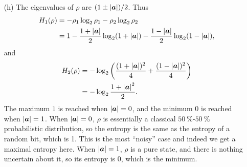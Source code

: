 \documentclass[hyperref, a4paper]{article}
\begin{document}
\begin{itemize}
\item[(h)] The eigenvalues of $\rho$ are $(1 \pm \abs{\vb*{a}}) / 2$.
Thus 
\begin{equation}
    \begin{aligned}
        H_1(\rho) &= - \rho_1 \log_2 \rho_1 - \rho_2 \log_2 \rho_2 \\
        &= 1 - \frac{1 + \abs{\vb*{a}}}{2} \log_2 (1 + \abs{\vb*{a}})
        - \frac{1 - \abs{\vb*{a}}}{2} \log_2 (1 - \abs{\vb*{a}}),
    \end{aligned}
\end{equation}
and 
\begin{equation}
    \begin{aligned}
        H_2 (\rho) &= - \log_2 \left( \frac{(1 + \abs{\vb*{a}})^2}{4} + \frac{(1 - \abs{\vb*{a}})^2}{4} \right) \\
        &= - \log_2 \frac{1 + \abs{\vb*{a}}^2}{2}.
    \end{aligned}
\end{equation}
The maximum $1$ is reached when $\abs{\vb*{a}} = 0$,
and the minimum $0$ is reached when $\abs{\vb*{a}} = 1$.
When $\abs{\vb*{a}} = 0$, 
$\rho$ is essentially a classical $\SI{50}{\percent}$-$\SI{50}{\percent}$ probabilistic distribution,
so the entropy is the same as the entropy of a random bit, which is 1.
This is the most ``noisy'' case and indeed we get a maximal entropy here.
When $\abs{\vb*{a}} = 1$, $\rho$ is a pure state,
and there is nothing uncertain about it, so its entropy is 0, which is the minimum.

\end{itemize}
\end{document}
